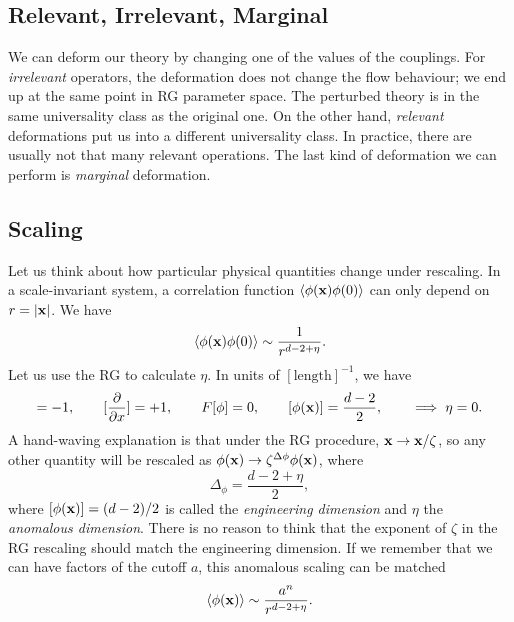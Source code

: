 \subsection{Relevant, Irrelevant, Marginal}%
\label{sub:relevant_irrelevant_marginal}

\begin{wrapfigure}{R}{0.35\textwidth}
  \centering
  \def\svgwidth{0.3\columnwidth}
  
  \caption{}
  \label{fig:l9f2}
\end{wrapfigure}
We can deform our theory by changing one of the values of the couplings.
For \emph{irrelevant} operators, the deformation does not change the flow behaviour; we end up at the same point in RG parameter space.
The perturbed theory is in the same universality class as the original one.
On the other hand, \emph{relevant} deformations put us into a different universality class.
In practice, there are usually not that many relevant operations.
The last kind of deformation we can perform is \emph{marginal} deformation.

\subsection{Scaling}%
\label{sub:scaling}

Let us think about how particular physical quantities change under rescaling.
In a scale-invariant system, a correlation function $\langle \phi(\vb{x}) \phi(0) \rangle$ can only depend on $r = \abs{\vb{x}}$. We have
\begin{equation}
  \langle \phi(\vb{x}) \phi(0) \rangle \sim \frac{1}{r^{d-2 + \eta}}.
\end{equation}
Let us use the RG to calculate $\eta$.
In units of $[\text{length}]^{-1}$, we have
\begin{equation}
  [x] = -1, \qquad [\pdv{}{x}] = +1, \qquad F[\phi] = 0, \qquad [\phi(\vb{x})] = \frac{d-2}{2},\qquad \implies \eta = 0.
\end{equation}
A hand-waving explanation is that under the RG procedure, $\vb{x} \to \vb{x}/\zeta$, so any other quantity will be rescaled as $\phi(\vb{x}) \to \zeta^{\Delta \phi} \phi(\vb{x})$, where
\begin{equation}
  \Delta_\phi = \frac{d-2 + \eta}{2},
\end{equation}
where $[\phi(\vb{x})] = (d-2)/2$ is called the \emph{engineering dimension} and $\eta$ the \emph{anomalous dimension}.
There is no reason to think that the exponent of $\zeta$ in the RG rescaling should match the engineering dimension.
If we remember that we can have factors of the cutoff $a$, this anomalous scaling can be matched
\begin{equation}
  \langle \phi(\vb{x}) \rangle \sim \frac{a^n}{r^{d-2 + \eta}}.
\end{equation}

